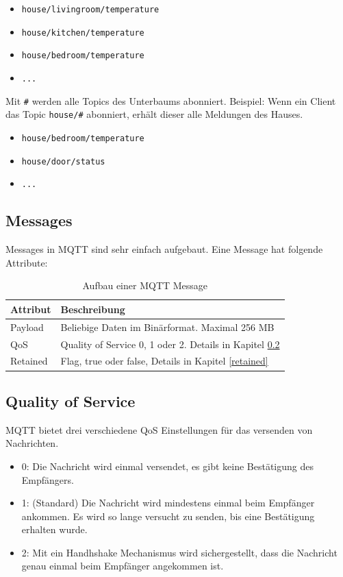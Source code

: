 \begin{itemize}
	\item \texttt{house/livingroom/temperature}
    \item \texttt{house/kitchen/temperature}
    \item \texttt{house/bedroom/temperature}
    \item \texttt{...}
\end{itemize}

Mit \texttt{\#} werden alle Topics des Unterbaums abonniert.
Beispiel: Wenn ein Client das Topic \texttt{house/\#} abonniert, erhält dieser alle Meldungen des Hauses.

\begin{itemize}
	\item \texttt{house/bedroom/temperature}
    \item \texttt{house/door/status}
    \item \texttt{...}
\end{itemize}

\subsection{Messages}
Messages in MQTT sind sehr einfach aufgebaut. Eine Message hat folgende Attribute:\\

\begin{table}[h!]
\centering
\begin{tabular}{ |l|l| }
	\hline
	Attribut & Beschreibung \\ 
	\hline
	Payload    	& Beliebige Daten im Binärformat. Maximal 256 MB     \\
	QoS    		& Quality of Service 0, 1 oder 2. Details in Kapitel \ref{qos}    \\ 
	Retained    & Flag, true oder false, Details in Kapitel \ref{retained}     \\ 
	\hline
\end{tabular}
\caption{Aufbau einer MQTT Message}
\end{table}


\subsection{Quality of Service} \label{qos}
MQTT bietet drei verschiedene QoS Einstellungen für das versenden von Nachrichten.
\begin{itemize}
\item 0: Die Nachricht wird einmal versendet, es gibt keine Bestätigung des Empfängers.
\item 1: (Standard) Die Nachricht wird mindestens einmal beim Empfänger ankommen. Es wird so lange versucht zu senden, bis eine Bestätigung erhalten wurde.
\item 2: Mit ein Handhshake Mechanismus wird sichergestellt, dass die Nachricht genau einmal beim Empfänger angekommen ist.
\end{itemize}

